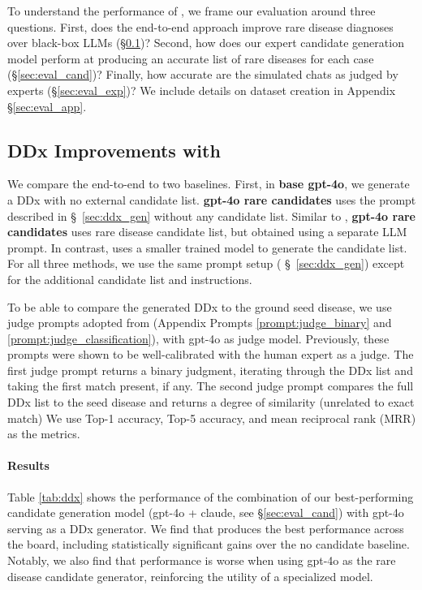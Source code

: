 

To understand the performance of \methodname, we frame our evaluation around three questions.   First, does the \methodname end-to-end approach improve rare disease diagnoses over black-box LLMs (\S \ref{sec:eval_ddx})?  
Second, how does our expert candidate generation model perform at producing an accurate list of rare diseases for each case (\S \ref{sec:eval_cand})? Finally, how accurate are the simulated chats as judged by experts (\S \ref{sec:eval_exp})?  We include details on dataset creation in Appendix \S \ref{sec:eval_app}.


\subsection{DDx Improvements with \methodname}
\label{sec:eval_ddx}

We compare the end-to-end \methodname to two baselines.  First, in \textbf{base gpt-4o}, we generate a DDx with no external candidate list. \textbf{gpt-4o rare candidates} uses the \methodname prompt described in \S~\ref{sec:ddx_gen} without any candidate list. Similar to \methodname, \textbf{gpt-4o rare candidates} uses rare disease candidate list, but obtained using a separate LLM prompt. In contrast, \methodname uses a smaller trained model to generate the candidate list. For all three methods, we use the same prompt setup ( \S~\ref{sec:ddx_gen})  except for the additional candidate list and instructions. 

To be able to compare the generated DDx to the ground seed disease,  we use judge prompts adopted from \citet{tu2024conversationaldiagnosticai} (Appendix Prompts \ref{prompt:judge_binary} and \ref{prompt:judge_classification}), with gpt-4o as judge model. Previously, these prompts were shown to be well-calibrated with the human expert as a judge.  The first judge prompt returns a binary judgment, iterating through the DDx list and taking the first match present, if any.  The second judge prompt compares the full DDx list to the seed disease and returns a degree of similarity (unrelated to exact match) We use Top-1 accuracy, Top-5 accuracy, and mean reciprocal rank (MRR) as the metrics. 


\paragraph{Results} Table \ref{tab:ddx} shows the performance of the combination of our best-performing candidate generation model (gpt-4o + claude, see \S \ref{sec:eval_cand}) with gpt-4o serving as a DDx generator. We find that \methodname produces the best performance across the board, including statistically significant gains over the no candidate baseline. Notably, we also find that performance is worse when using gpt-4o as the rare disease candidate generator, reinforcing the utility of a specialized model.


